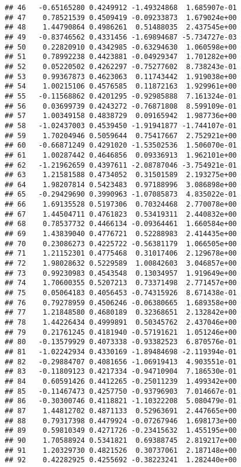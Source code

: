 \documentclass[
]{article}
\begin{document}
\begin{verbatim}
## 46   -0.65165280 0.4249912 -1.49324868  1.685907e-01
## 47    0.78521539 0.4509419 -0.09233873  1.679024e+00
## 48    1.44790864 0.4986261  0.51488035  2.437545e+00
## 49   -0.83746562 0.4331456 -1.69894687 -5.734727e-03
## 50    0.22820910 0.4342985 -0.63294630  1.060598e+00
## 51    0.78992238 0.4423881 -0.04929347  1.701282e+00
## 52    0.05220502 0.4262297 -0.75277602  8.738243e-01
## 53    0.99367873 0.4623063  0.11743442  1.919038e+00
## 54    1.00215106 0.4576585  0.11872163  1.929961e+00
## 55   -0.11568862 0.4201295 -0.92985888  7.161324e-01
## 56    0.03699739 0.4243272 -0.76871808  8.599109e-01
## 57    1.00349158 0.4838729  0.09165942  1.987736e+00
## 58   -1.02437003 0.4539450 -1.91941877 -1.744107e-01
## 59    1.70204946 0.5059644  0.75417667  2.752921e+00
## 60   -0.66871249 0.4291020 -1.53502536  1.506070e-01
## 61    1.00287442 0.4646856  0.09336913  1.962101e+00
## 62   -1.21962659 0.4397611 -2.08787046 -3.754921e-01
## 63    1.21581588 0.4734052  0.31501589  2.193275e+00
## 64    1.98207814 0.5423483  0.97188996  3.086898e+00
## 65   -0.29429690 0.3990963 -1.07085873  4.835022e-01
## 66    1.69135528 0.5197306  0.70324468  2.770078e+00
## 67    1.44504711 0.4761823  0.53419311  2.440832e+00
## 68    0.78537732 0.4466134 -0.09364461  1.660584e+00
## 69    1.43839040 0.4776721  0.52288983  2.414435e+00
## 70    0.23086273 0.4225722 -0.56381179  1.066505e+00
## 71    1.21152301 0.4775468  0.31017406  2.129678e+00
## 72    1.98028632 0.5229589  1.00842603  3.046857e+00
## 73    0.99230983 0.4543548  0.13034957  1.919649e+00
## 74    1.70600355 0.5207213  0.73371498  2.771457e+00
## 75    0.05064183 0.4056453 -0.74315926  8.671438e-01
## 76    0.79278959 0.4506246 -0.06380665  1.689358e+00
## 77    1.21848580 0.4680189  0.32368651  2.132842e+00
## 78    1.44226434 0.4999891  0.50345762  2.437046e+00
## 79    0.21761245 0.4181940 -0.57191621  1.051246e+00
## 80   -0.13579929 0.4073338 -0.93382523  6.870576e-01
## 81   -1.02242934 0.4330169 -1.89484698 -2.119394e-01
## 82   -0.29884707 0.4081656 -1.06919413  4.903551e-01
## 83   -0.11809123 0.4217334 -0.94710904  7.186530e-01
## 84    0.60591426 0.4412265 -0.25011239  1.499342e+00
## 85   -0.11467473 0.4257750 -0.93796903  7.014667e-01
## 86   -0.30300746 0.4118821 -1.10322208  5.080479e-01
## 87    1.44812702 0.4871133  0.52963691  2.447665e+00
## 88    0.79317398 0.4479924 -0.07267946  1.698173e+00
## 89    0.59810349 0.4271726 -0.23415632  1.455195e+00
## 90    1.70588924 0.5341821  0.69388745  2.819217e+00
## 91    1.20329730 0.4821526  0.30737061  2.187148e+00
## 92    0.42282925 0.4255692 -0.38223241  1.282440e+00

\end{verbatim}
\end{document}
